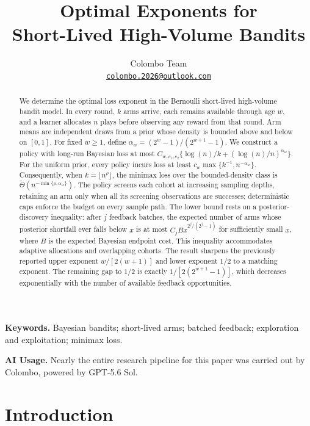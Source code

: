 \documentclass[11pt,letterpaper]{article}
\title{Optimal Exponents for\\Short-Lived High-Volume Bandits}
\author{Colombo Team\\[3pt]
  \small\href{mailto:colombo.2026@outlook.com}{\texttt{colombo.2026@outlook.com}}}
\date{}
\numberwithin{equation}{section}
\theoremstyle{definition}
\theoremstyle{remark}
\newcommand{\1}{\mathbf{1}}
\newcommand{\wtTheta}{\widetilde{\Theta}}
\begin{document}
\maketitle

\begin{abstract}
We determine the optimal loss exponent in the Bernoulli short-lived
high-volume bandit model. In every round, $k$ arms arrive, each remains
available through age $w$, and a learner allocates $n$ plays before observing
any reward from that round. Arm means are independent draws from a prior
whose density is bounded above and below on $[0,1]$. For fixed $w\ge1$, define
$\alpha_w=(2^w-1)/(2^{w+1}-1)$. We construct a policy with long-run
Bayesian loss at most
$C_{w,c_1,c_2}\{\log(n)/k+(\log(n)/n)^{\alpha_w}\}$.
For the uniform prior, every policy incurs loss at least
$c_w\max\{k^{-1},n^{-\alpha_w}\}$.
Consequently, when $k=\lfloor n^\rho\rfloor$, the minimax loss over the
bounded-density class is
$\wtTheta(n^{-\min\{\rho,\alpha_w\}})$.
The policy screens each cohort at increasing sampling depths, retaining an
arm only when all its screening observations are successes; deterministic
caps enforce the budget on every sample path. The lower bound rests on a
posterior-discovery inequality: after $j$ feedback batches, the expected
number of arms whose posterior shortfall ever falls below $x$ is at most
$C_j Bx^{2^j/(2^j-1)}$ for sufficiently small $x$, where $B$ is the
expected Bayesian endpoint cost.
This inequality accommodates adaptive allocations and overlapping cohorts.
The result sharpens the previously reported upper exponent
$w/[2(w+1)]$ and lower exponent $1/2$ to a matching exponent.
The remaining gap to $1/2$ is exactly
$1/[2(2^{w+1}-1)]$, which decreases exponentially with the number of
available feedback opportunities.
\end{abstract}

\noindent\textbf{Keywords.}
Bayesian bandits; short-lived arms; batched feedback; exploration and
exploitation; minimax loss.

\begin{samepage}
\noindent\textbf{AI Usage.}
Nearly the entire research pipeline for this paper was carried out by
Colombo, powered by GPT-5.6 Sol.
\par
\end{samepage}

\section{Introduction}
\end{document}
